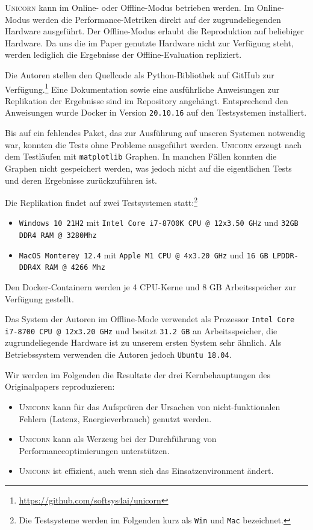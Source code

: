 \documentclass[11pt]{article}
\begin{document}
\textsc{Unicorn} kann im Online- oder Offline-Modus betrieben werden. Im Online-Modus werden die Performance-Metriken direkt auf der zugrundeliegenden Hardware ausgeführt. Der Offline-Modus erlaubt die Reproduktion auf beliebiger Hardware. Da uns die im Paper genutzte Hardware nicht zur Verfügung steht, werden lediglich die Ergebnisse der Offline-Evaluation repliziert.

Die Autoren stellen den Quellcode als Python-Bibliothek auf GitHub zur Verfügung.\footnote{\href{https://github.com/softsys4ai/unicorn}{https://github.com/softsys4ai/unicorn}} Eine Dokumentation sowie eine ausführliche Anweisungen zur Replikation der Ergebnisse sind im Repository angehängt. Entsprechend den Anweisungen wurde Docker in Version \texttt{20.10.16} auf den Testsystemen installiert.

Bis auf ein fehlendes Paket, das zur Ausführung auf unseren Systemen notwendig war, konnten die Tests ohne Probleme ausgeführt werden. \textsc{Unicorn} erzeugt nach dem Testläufen mit \texttt{matplotlib} Graphen. In manchen Fällen konnten die Graphen nicht gespeichert werden, was jedoch nicht auf die eigentlichen Tests und deren Ergebnisse zurückzuführen ist.

Die Replikation findet auf zwei Testsystemen statt:\footnote{Die Testsysteme werden im Folgenden kurz als \texttt{Win} und \texttt{Mac} bezeichnet.}
\begin{itemize}
  \itemsep0em
  \item \texttt{Windows 10 21H2} mit \texttt{Intel Core i7-8700K CPU @ 12x3.50 GHz} und \texttt{32GB DDR4 RAM @ 3280Mhz}
  \item \texttt{MacOS Monterey 12.4} mit \texttt{Apple M1 CPU @ 4x3.20 GHz} und \texttt{16 GB LPDDR-DDR4X RAM @ 4266 Mhz}
\end{itemize}
Den Docker-Containern werden je 4 CPU-Kerne und 8 GB Arbeitsspeicher zur Verfügung gestellt.

Das System der Autoren im Offline-Mode verwendet als Prozessor \texttt{Intel Core i7-8700 CPU @ 12x3.20 GHz} und besitzt \texttt{31.2 GB} an Arbeitsspeicher, die zugrundeliegende Hardware ist zu unserem ersten System sehr ähnlich. Als Betriebssystem verwenden die Autoren jedoch \texttt{Ubuntu 18.04}.

Wir werden im Folgenden die Resultate der drei Kernbehauptungen des Originalpapers reproduzieren:

\begin{itemize}
  \itemsep0em
  \item \textsc{Unicorn} kann für das Aufsprüren der Ursachen von nicht-funktionalen Fehlern (Latenz, Energieverbrauch) genutzt werden.
  \item \textsc{Unicorn} kann als Werzeug bei der Durchführung von Performanceoptimierungen unterstützen.
  \item \textsc{Unicorn} ist effizient, auch wenn sich das Einsatzenvironment ändert.
\end{itemize}
\end{document}
